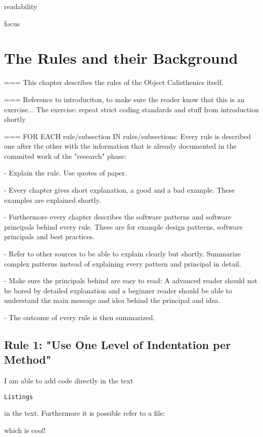 readability

focus


\section{The Rules and their Background}
\label{d:background}
=== This chapter describes the rules of the Object Calisthenics itself. 

=== Reference to introduciton, to make sure the reader know that this is an exercise... The exercise: repeat strict coding standards and stuff from introduction shortly


=== FOR EACH rule/subsection IN rules/subsections: 
Every rule is described one after the other with the information that is already documented in the commited work of the "research" phase: 

 - Explain the rule. Use quotes of paper. 
 
 - Every chapter gives short explanation, a good and a bad example. These examples are explained shortly. 
 
 -  Furthermore every chapter describes the software patterns and software principals behind every rule. These are for example design patterns, software principals and best practices. 
 
 - Refer to other sources to be able to explain clearly but shortly. Summarize complex patterns instead of explaining every pattern and principal in detail. 
 
 - Make sure the principals behind are easy to read: A advanced reader should not be bored by detailed explanation and a beginner reader should be able to understand the main message and idea behind the principal and idea.
 
 - The outcome of every rule is then summarized.

\subsection{Rule 1: "Use One Level of Indentation per Method"}
I am able to add code directly in the text 

\begin{lstlisting}
Listings
\end{lstlisting}

 in the text. 
Furthermore it is possible refer to a file: 



which is cool!

